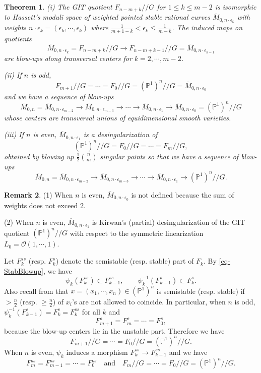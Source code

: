 \documentclass[10pt]{amsart}
\newtheorem{theorem}{Theorem}[section]
\theoremstyle{definition}
\newtheorem{remark}[theorem]{Remark}
\newcommand{\PP}{\mathbb{P}}
\newcommand{\cO}{\mathcal{O} }
\def\Mzn{\overline{M}_{0,n} }
\def\Mzez{\overline{M}_{0,n\cdot \epsilon_0} }
\def\Mzeo{\overline{M}_{0,n\cdot \epsilon_1} }
\def\Mzemt{\overline{M}_{0,n\cdot \epsilon_{m-2}} }
\def\Mzemth{\overline{M}_{0,n\cdot \epsilon_{m-3}} }
\def\Mzek{\overline{M}_{0,n\cdot \epsilon_k} }
\def\Mzeko{\overline{M}_{0,n\cdot \epsilon_{k-1}} }
\def\git{/\!/ }
\begin{document}
\begin{theorem}\label{thm4-1} (i) The GIT quotient
$F_{n-m+k}\git G$ for $1\le k\le m-2$ is
isomorphic to Hassett's moduli space of weighted pointed stable
rational curves $\Mzek$ with weights $n\cdot
\epsilon_k=(\epsilon_k,\cdots,\epsilon_k)$ where
$\frac1{m+1-k}<\epsilon_k\le \frac1{m-k}$. The induced maps on
quotients \[ \Mzek = F_{n-m+k}\git G \to F_{n-m+k-1}\git G
=\Mzeko\] are blow-ups along transversal centers for $k=2,\cdots,
m-2$.

(ii) If $n$ is odd, $$F_{m+1}\git G=\cdots =F_0\git
G=(\PP^1)^n\git G=\Mzez$$ and we have a sequence of blow-ups
\[
\Mzn=\Mzemt\to \Mzemth \to \cdots \to \Mzeo\to \Mzez =
(\PP^1)^n\git G
\]
whose centers are transversal unions of equidimensional smooth
varieties.

(iii) If $n$ is even, $\Mzeo$ is a desingularization of
$$(\PP^1)^n\git G=F_0\git G=\cdots =F_m\git G,$$
obtained by blowing up $\frac12\binom{n}{m}$
singular points so that we have a sequence of blow-ups
\[
\Mzn=\Mzemt\to \Mzemth \to \cdots \to \Mzeo\to (\PP^1)^n\git G.
\]
\end{theorem}
\begin{remark}
(1) When $n$ is even, $\Mzez$ is not defined because the sum of
weights does not exceed $2$.

(2) When $n$ is even, $\Mzeo$ is Kirwan's (partial)
desingularization of the GIT quotient $(\PP^1)^n\git G$ with
respect to the symmetric linearization $L_0=\cO(1,\cdots,1)$.
\end{remark}

Let $F_k^{ss}$ (resp. $F_k^s$) denote the semistable (resp. stable)
part of $F_k$. By \eqref{eq-StabBlowup}, we have
\begin{equation}\label{eq4-2}
\psi_k(F_k^{ss})\subset F_{k-1}^{ss},\qquad
\psi_k^{-1}(F_{k-1}^s)\subset F_k^s.
\end{equation}
Also recall from \cite{K1} that $x=(x_1,\cdots,x_n)\in (\PP^1)^n$
is semistable (resp. stable) if $> \frac{n}2$ (resp. $\ge
\frac{n}2$) of $x_i$'s are not allowed to coincide. In particular,
when $n$ is odd, $\psi_k^{-1}(F_{k-1}^s)=F_k^s=F_k^{ss}$ for all
$k$ and
\begin{equation}\label{eq4-3}
F_{m+1}^s=F_{m}^s=\cdots =F_0^s,
\end{equation}
because the blow-up centers lie in the unstable part. Therefore we
have
\begin{equation}\label{eq4-4}
F_{m+1}\git G = \cdots =F_0\git G= (\PP^1)^n\git G.
\end{equation}
When $n$ is even, $\psi_k$ induces a morphism $F_k^{ss}\to
F_{k-1}^{ss}$ and we have
\begin{equation}\label{eq4-5}
F_m^{ss}=F_{m-1}^{ss}=\cdots =F_0^{ss} \quad \text{and}\quad F_m\git
G=\cdots =F_0\git G=(\PP^1)^n\git G.
\end{equation}
\end{document}
